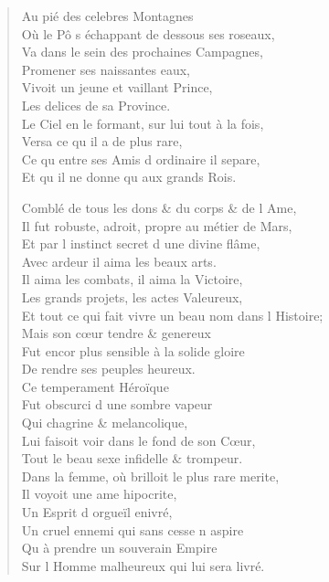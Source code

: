 \begin{verse}
Au pié des celebres Montagnes \\
\vin Où le Pô s\textquotesingle{} échappant de dessous ses roseaux, \\
\vin Va dans le sein des prochaines Campagnes, \\
\vin Promener ses naissantes eaux, \\
\vin Vivoit un jeune et vaillant Prince, \\
\vin Les delices de sa Province. \\
Le Ciel en le formant, sur lui tout à la fois, \\
\vin Versa ce qu\textquotesingle{} il a de plus rare, \\
Ce qu\textquotesingle{} entre ses Amis d\textquotesingle{} ordinaire il separe, \\
\vin Et qu\textquotesingle{} il ne donne qu\textquotesingle{} aux grands Rois.

Comblé de tous les dons \& du corps \& de l\textquotesingle{} Ame, \\
Il fut robuste, adroit, propre au métier de Mars, \\
Et par l\textquotesingle{} instinct secret d\textquotesingle{} une divine flâme, \\
\vin Avec ardeur il aima les beaux arts. \\
Il aima les combats, il aima la Victoire, \\
\vin Les grands projets, les actes Valeureux, \\
Et tout ce qui fait vivre un beau nom dans l\textquotesingle{} Histoire; \\
\vin Mais son cœur tendre \& genereux \\
Fut encor plus sensible à la solide gloire \\
\vin De rendre ses peuples heureux. \\
\vin Ce temperament Héroïque \\
\vin Fut obscurci d\textquotesingle{} une sombre vapeur \\
\vin Qui chagrine \& melancolique, \\
\vin Lui faisoit voir dans le fond de son Cœur, \\
\vin Tout le beau sexe infidelle \& trompeur. \\
Dans la femme, où brilloit le plus rare merite, \\
\vin Il voyoit une ame hipocrite, \\
\vin Un Esprit d\textquotesingle{} orgueïl enivré, \\
Un cruel ennemi qui sans cesse n\textquotesingle{} aspire \\
\vin Qu\textquotesingle{} à prendre un souverain Empire \\
Sur l\textquotesingle{} Homme malheureux qui lui sera livré.


\end{verse}
